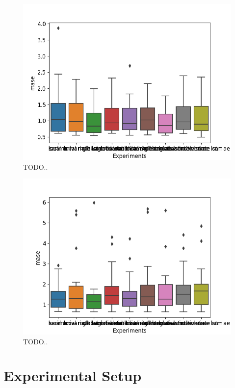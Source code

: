 \begin{figure}[h!]
  \centering
  \includegraphics[width=\textwidth]{./figs/results/boxplot/mase-dataset_1.png}
  \hfill
  \caption{TODO..}
  \label{fig:results:boxplot-mase-dataset-1}
\end{figure}

\begin{figure}[h!]
  \centering
  \includegraphics[width=\textwidth]{./figs/results/boxplot/mase-dataset_2.png}
  \hfill
  \caption{TODO..}
  \label{fig:results:boxplot-mase-dataset-2}
\end{figure}



\iffalse

  \section{Experimental Setup}
  \label{sec:experimentalSetup}

